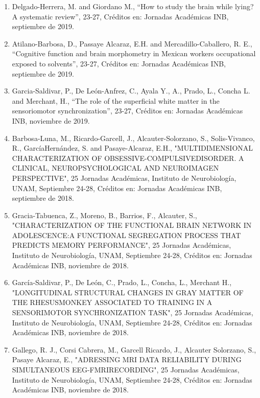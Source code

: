 \begin{enumerate}
\item Delgado-Herrera, M. and Giordano M., “How to study the brain while lying? A systematic review”, 23-27, Créditos en: 
Jornadas Académicas INB, septiembre de 2019.

\item Atilano-Barbosa, D., Passaye Alcaraz, E.H. and Mercadillo-Caballero, R. E., “Cognitive function and brain morphometry 
in Mexican workers occupational exposed to solvents”, 23-27, Créditos en: Jornadas Académicas INB, septiembre de 2019.

\item Garcia-Saldivar, P., De León-Anfrez, C., Ayala Y., A., Prado, L., Concha L. and Merchant, H., “The role of the 
superficial white matter in the sensoriomotor synchronization”, 23-27, Créditos en: Jornadas Académicas INB, noviembre de 
2019.

\item Barbosa-Luna, M., Ricardo-Garcell, J., Alcauter-Solorzano, S., Solis-Vivanco, R., GarcíaHernández, S. and 
Pasaye-Alcaraz, E.H., "MULTIDIMENSIONAL CHARACTERIZATION OF OBSESSIVE-COMPULSIVEDISORDER. A CLINICAL, NEUROPSYCHOLOGICAL 
AND NEUROIMAGEN PERSPECTIVE", 25 Jornadas Académicas, Instituto de Neurobiología, UNAM, Septiembre 24-28, Créditos en: 
Jornadas Académicas INB, septiembre de 2018.

\item Gracia-Tabuenca, Z., Moreno, B., Barrios, F., Alcauter, S., "CHARACTERIZATION OF THE FUNCTIONAL BRAIN NETWORK IN 
ADOLESCENCE:A FUNCTIONAL SEGREGATION PROCESS THAT PREDICTS MEMORY PERFORMANCE", 25 Jornadas Académicas, Instituto de 
Neurobiología, UNAM, Septiembre 24-28, Créditos en: Jornadas Académicas INB, noviembre de 2018.

\item García-Saldivar, P., De León, C., Prado, L., Concha, L., Merchant H., "LONGITUDINAL STRUCTURAL CHANGES IN GRAY MATTER 
OF THE RHESUSMONKEY ASSOCIATED TO TRAINING IN A SENSORIMOTOR SYNCHRONIZATION TASK", 25 Jornadas Académicas, Instituto de Neurobiología, UNAM, 
Septiembre 24-28, Créditos en: Jornadas Académicas INB, noviembre de 2018.

\item Gallego, R. J., Corsi Cabrera, M., Garcell Ricardo, J., Alcauter Solorzano, S., Pasaye Alcaraz, E., "ADRESSING MRI DATA 
RELIABILITY DURING SIMULTANEOUS EEG-FMRIRECORDING", 25 Jornadas Académicas, Instituto de Neurobiología, UNAM, Septiembre 
24-28, Créditos en: Jornadas Académicas INB, noviembre de 2018.


\end{enumerate}
